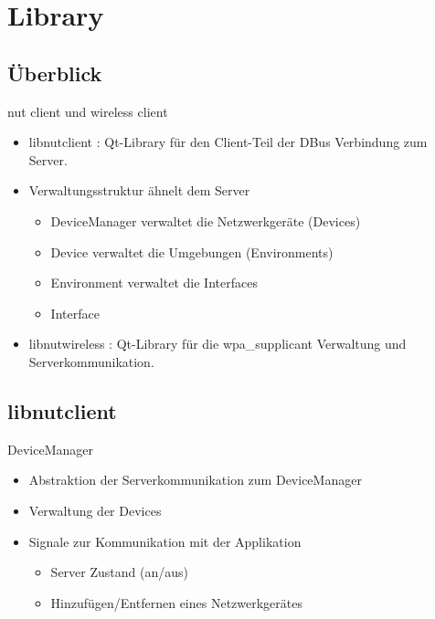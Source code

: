 
\section{Library}
\subsection{Überblick}
\begin{frame}[<+-| alert@+>]{nut client und wireless client}
	\begin{itemize}
		\item libnutclient : Qt-Library für den Client-Teil der DBus Verbindung zum Server.
		\item Verwaltungsstruktur ähnelt dem Server
		\begin{itemize}
			\item DeviceManager verwaltet die Netzwerkgeräte (Devices)
			\item Device verwaltet die Umgebungen (Environments)
			\item Environment verwaltet die Interfaces
			\item Interface
		\end{itemize}

		\item libnutwireless : Qt-Library für die wpa\_supplicant Verwaltung und Serverkommunikation.
	\end{itemize}
\end{frame}

\subsection{libnutclient}
\begin{frame}[<+-| alert@+>]{DeviceManager}
	\begin{itemize}
		\item Abstraktion der Serverkommunikation zum DeviceManager
		\item Verwaltung der Devices
		\item Signale zur Kommunikation mit der Applikation
		\begin{itemize}
			\item Server Zustand (an/aus)
			\item Hinzufügen/Entfernen eines Netzwerkgerätes
		\end{itemize}
	\end{itemize}
\end{frame}

